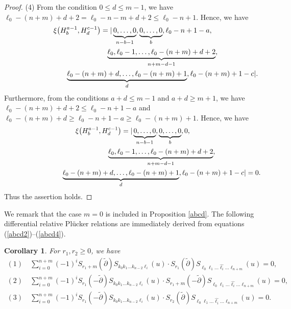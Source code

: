 \documentclass[10pt,a4paper]{amsart}
\numberwithin{equation}{section}
\newtheorem{Corollary}[Theorem]{Corollary}
\begin{document}
\begin{proof}
(4) From the condition $0\leq d \leq m-1$, we have $\ell_0-(n+m)+d+2=\ell_{0}-n-m+d+2\leq \ell_{0}-n+1$. Hence, we have
\begin{gather*}
\xi\bigl(H^{a-1}_{b},H^{c-1}_{d}\bigr)=|\underbrace{0,\dots,0}_{n-b-1},%
\underbrace{0,\dots, 0}_{b},\ell_{0}-n+1-a,\nonumber\\
\hphantom{\xi\bigl(H^{a-1}_{b},H^{c-1}_{d}\bigr)=|}{}
\underbrace{\ell_{0},\ell_{0}-1,\dots,\ell_{0}-(n+m)+d+2}_{n+m-d-1},\nonumber\\
\hphantom{\xi\bigl(H^{a-1}_{b},H^{c-1}_{d}\bigr)=|}{}
\underbrace{\ell_{0}-(n+m)+d,\dots,\ell_{0}-(n+m)+1}_{d},\ell_{0}-(n+m)+1-c|\nonumber.
\end{gather*}
Furthermore, from the conditions $a+d\leq m-1$ and $a+d\geq m+1$, we have $\ell_{0}-(n+m)+d+2\leq \ell_{0}-n+1-a$ and $\ell_{0}-(n+m)+d\geq \ell_{0}-n+1-a\geq \ell_{0}-(n+m)+1$.
Hence, we have
\begin{gather*}
\xi\bigl(H^{a-1}_{b},H^{c-1}_{d}\bigr)=|\underbrace{0,\dots,0}_{n-b-1},%
\underbrace{0,\dots, 0}_{b},0,\nonumber\\
\hphantom{\xi\bigl(H^{a-1}_{b},H^{c-1}_{d}\bigr)=|}{}
\underbrace{\ell_{0},\ell_{0}-1,\dots,\ell_{0}-(n+m)+d+2}_{n+m-d-1},\nonumber\\
\hphantom{\xi\bigl(H^{a-1}_{b},H^{c-1}_{d}\bigr)=|}{}
\underbrace{\ell_{0}-(n+m)+d,\dots,\ell_{0}-(n+m)+1}_{d},\ell_{0}-(n+m)+1-c|=0.
\end{gather*}
Thus the assertion holds.
\end{proof}

We remark that the case $m=0$ is included in Proposition \ref{abcd}. The following differential relative Pl\"ucker relations are immediately derived from equations (\ref{abcd2})--(\ref{abcd4}).
\begin{Corollary}%
For $r_1,r_2 \geq 0$, we have
\begin{gather*}
(1)\quad\sum_{i=0}^{n+m}{(-1)}^{i}S_{{r_1}+m}(\widetilde{\partial})S_{k_0 k_1\dots k_{n-2}\ell_i}(u)\cdot S_{r_1}(\widetilde{\partial})S_{\ell_0 \ell_1\dots \widehat{\ell_{i}}\dots\ell_{n+m}}(u)=0,\\
(2)\quad\sum_{i=0}^{n+m}{(-1)}^{i}S_{r_1}(-\widetilde{\partial})S_{k_0 k_1\dots k_{n-2}\ell_i}(u)\cdot S_{{r_1}+m}(-\widetilde{\partial})S_{\ell_0 \ell_1\dots \widehat{\ell_{i}}\dots\ell_{n+m}}(u)=0,\\
(3)\quad\sum_{i=0}^{n+m}{(-1)}^{i}S_{r_1}(-\widetilde{\partial})S_{k_0 k_1\dots k_{n-2}\ell_i}(u)\cdot S_{r_2}(\widetilde{\partial})S_{\ell_0 \ell_1\dots \widehat{\ell_{i}}\dots\ell_{n+m}}(u)=0.
\end{gather*}
\end{Corollary}
\end{document}
